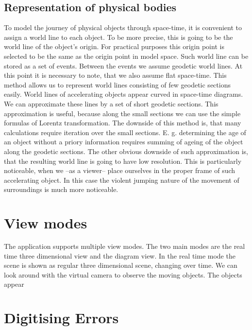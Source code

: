 \documentclass{egpubl}
\begin{document}
\subsection{Representation of physical bodies}
To model the journey of physical objects through space-time, it is convenient to assign a world line to each object. To be more precise, this is going to be the world line of the object's origin. For practical purposes this origin point is selected to be the same as the origin point in model space. Such world line can be stored as a set of events. Between the events we assume geodetic world lines. At this point it is necessary to note, that we also assume flat space-time. This method allows us to represent world lines consisting of few geodetic sections easily. World lines of accelerating objects appear curved in space-time diagrams. We can approximate these lines by a set of short geodetic sections. This approximation is useful, because along the small sections we can use the simple formulas of Lorentz transformation. The downside of this method is, that many calculations require iteration over the small sections. E. g. determining the age of an object without a priory information requires summing of ageing of the object along the geodetic sections. The other obvious downside of such approximation is, that the resulting world line is going to have low resolution. This is particularly noticeable, when we --as a viewer-- place ourselves in the proper frame of such accelerating object. In this case the violent jumping nature of the movement of surroundings is much more noticeable.

\section{View modes}
The application supports multiple view modes. The two main modes are the real time three dimensional view and the diagram view. In the real time mode the scene is shown as regular three dimensional scene, changing over time. We can look around with the virtual camera to observe the moving objects. The objects appear




\section{Digitising Errors}
\label{sec:digErr}
\end{document}
